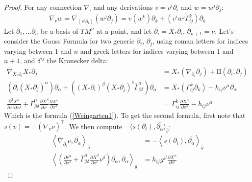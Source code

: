 \begin{proof}
	For any connection $\nabla_\cdot$ and any derivations $v=v^i \partial_i$ and $w=w^j \partial_j$:
	\begin{align*}
		\nabla_{v} w = \nabla_{(v^i \partial_i)} (w^j \partial_j) = v(w^k)\partial_k + (v^i w^j \Gamma^{k}_{ij})\partial_k
	\end{align*}
	Let $\partial_1, \dots \partial_n$ be a basis of $TM^n$ at a point, and let $\overline{\partial_i} = X_*\partial_i$, $\overline{\partial_{n+1}}=\nu$.
	Let's consider the Gauss Formula for two generic $\partial_i$, $\partial_j$, using roman letters for indices varying between $1$ and $n$ and greek letters for indices varying between $1$ and $n+1$, and $\delta^{ij}$ the Kronecker delta:
	\begin{align*}
		\overline{\nabla}_{X_*\partial_i} X_* \partial_j &= X_* (\nabla_{\partial_i} \partial_j)  + \mathrm{I\!I} (\partial_i, \partial_j) \\
		(\overline{\partial_i}(X_*\partial_j)^\alpha) \partial_\alpha + ((X_*\partial_i)^\beta (X_*\partial_j)^\delta \overline{ \Gamma}^{\alpha}_{\beta \delta})\overline{\partial_\alpha} &= X_* (\Gamma^{k}_{ij}\partial_k)  - h_{ij}\nu^\alpha \overline{\partial_\alpha}\\
		\frac{\partial^2 X^\alpha}{\partial x^i \partial x^j} +\overline{\Gamma}^\alpha_{\beta \delta}\frac{\partial X^\beta}{\partial x^i}\frac{\partial X^\delta}{\partial x^k}&=\Gamma^k_{ij}\frac{\partial X^\alpha}{\partial x^k}-h_{ij}\nu^\alpha
	\end{align*}
	Which is the formula (\ref{Weingarten1}). 
	To get the second formula, first note that $s(v) = -(\overline{\nabla}_v \nu)^\top$. We then compute $-\langle s(\partial_i), \overline{\partial_\alpha}\rangle_{\overline{g}}$:
	\begin{align*}
		\left\langle\overline{\nabla}_{\overline{\partial_i}} \nu, \overline{\partial_\alpha}\right\rangle_{\overline{g}} &= -\left\langle s(\partial_i), \overline{\partial_\alpha}\right\rangle_{\overline{g}}\\
		\left\langle \left(\frac{\partial \nu^\alpha}{\partial x^i}+\overline{\Gamma}^\alpha_{\beta \delta}\frac{\partial X^\beta}{\partial x^i} \nu^\delta \right)\overline{\partial_\alpha}, \overline{\partial_\alpha} \right\rangle_{\overline{g}}&= h_{ij}g^{jl}\frac{\partial X^\alpha}{\partial x^l}

\end{align*}
\end{proof}
